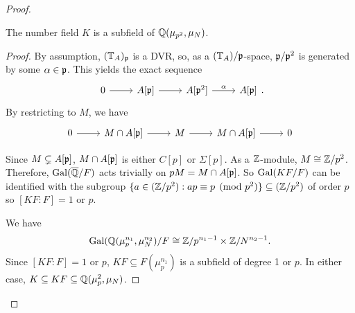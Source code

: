 \documentclass[thesis.tex]{subfiles}
\begin{document}
\begin{proof}
    \begin{lemma}
        The number field $K$ is a subfield of $\mathbb{Q}(\mu_{p^2}, \mu_N)$.
    \end{lemma}
    \begin{proof}
        By assumption, $(\mathbb{T}_A)_{\mathfrak{p}}$ is a DVR\@, so, as a $(\mathbb{T}_A)/\mathfrak{p}$-space,
        $\mathfrak{p}/\mathfrak{p}^2$ is generated by some $\alpha\in \mathfrak{p}$. This yields the exact
        sequence
        \[
            \begin{tikzcd}
                0 \arrow[r] &
                A[\p] \arrow[r] &
                A[\p^2] \arrow[r, "\alpha"] &
                A[\p]
            \end{tikzcd}.
        \]
        By restricting to $M$, we have
        \begin{equation}
            \label{eq:M_Ap}
            \begin{tikzcd}
                0 \arrow[r] &
                M\cap A[\p] \arrow[r] &
                M \arrow[r] &
                M\cap A[\p] \arrow[r] &
                0
            \end{tikzcd} 
        \end{equation}

        Since $M\subsetneq A[\mathfrak{p}]$, $M\cap A[\mathfrak{p}]$ is either $C[p]$ or
        $\Sigma[p]$. As a $\mathbb{Z}$-module, $M\cong \mathbb{Z}/p^2$. Therefore,
        $\operatorname{Gal}(\overline{\mathbb{Q}}/F)$ acts trivially on $pM=M\cap A[\mathfrak{p}]$. So $\operatorname{Gal}(KF/F)$
        can be identified with the subgroup $\{a\in (\mathbb{Z}/p^2):ap\equiv p
        \pmod{p^2}\}\subseteq (\mathbb{Z}/p^2)$ of order $p$ so $[KF:F]=1$ or $p$.

        We have 
        \[
            \operatorname{Gal}(\mathbb{Q}(\mu_p ^{n_1}, \mu_N ^{n_2})/F \cong \mathbb{Z}/p^{n_1-1} \times
            \mathbb{Z}/N^{n_2-1}.
        \]
        Since $[KF:F]=1$ or $p$, $KF\subseteq F(\mu_p ^{n_1})$ is a subfield of
        degree 1 or $p$. In either case, $K\subseteq KF \subseteq \mathbb{Q}(\mu_p ^2,
        \mu_N)$.
    \end{proof}
\end{proof}
\end{document}
